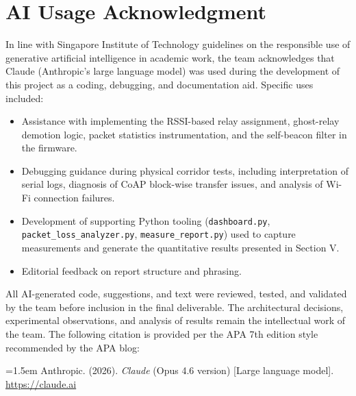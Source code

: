 \documentclass[12pt,a4paper]{article}
\begin{document}

\section*{AI Usage Acknowledgment}

In line with Singapore Institute of Technology guidelines on the responsible
use of generative artificial intelligence in academic work, the team
acknowledges that Claude (Anthropic's large language model) was used during
the development of this project as a coding, debugging, and documentation
aid. Specific uses included:

\begin{itemize}[leftmargin=1.5em, itemsep=0.2em]
    \item Assistance with implementing the RSSI-based relay assignment,
          ghost-relay demotion logic, packet statistics instrumentation,
          and the self-beacon filter in the firmware.
    \item Debugging guidance during physical corridor tests, including
          interpretation of serial logs, diagnosis of CoAP block-wise
          transfer issues, and analysis of Wi-Fi connection failures.
    \item Development of supporting Python tooling (\texttt{dashboard.py},
          \texttt{packet\_loss\_analyzer.py}, \texttt{measure\_report.py})
          used to capture measurements and generate the quantitative
          results presented in Section V.
    \item Editorial feedback on report structure and phrasing.
\end{itemize}

All AI-generated code, suggestions, and text were reviewed, tested, and
validated by the team before inclusion in the final deliverable. The
architectural decisions, experimental observations, and analysis of results
remain the intellectual work of the team. The following citation is
provided per the APA 7th edition style recommended by the APA blog:

\vspace{0.5em}
\noindent
\hangindent=1.5em
Anthropic. (2026). \textit{Claude} (Opus 4.6 version) [Large language model]. \url{https://claude.ai}

\newpage
\end{document}
